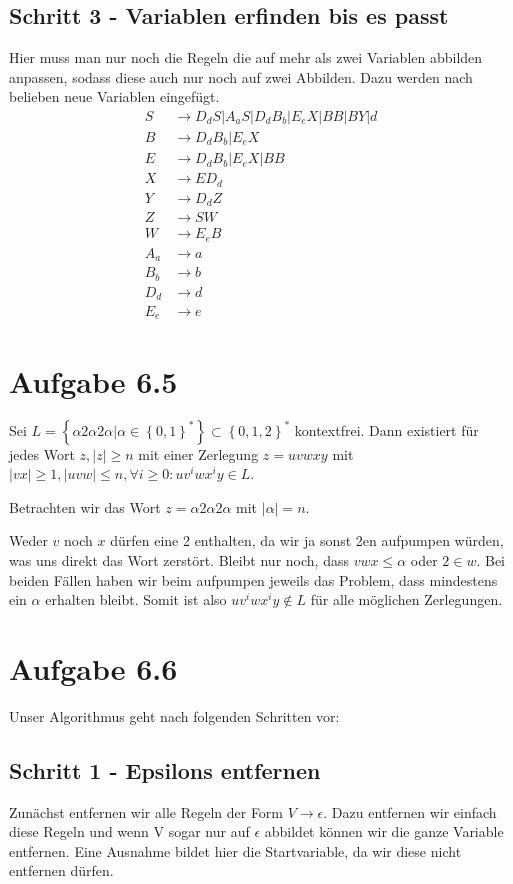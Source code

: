 \documentclass{article}
\begin{document}
\subsection*{Schritt 3 - Variablen erfinden bis es passt}
Hier muss man nur noch die Regeln die auf mehr als zwei Variablen abbilden anpassen, sodass diese auch nur noch auf zwei Abbilden. Dazu werden nach belieben neue Variablen eingefügt.
\begin{align*}
S&\rightarrow D_dS | A_aS | D_dB_b | E_eX | BB | BY | d\\
B&\rightarrow D_dB_b | E_eX\\
E&\rightarrow D_dB_b | E_eX | BB\\
X&\rightarrow ED_d \\
Y&\rightarrow D_dZ \\
Z&\rightarrow SW \\
W&\rightarrow E_eB \\
A_a&\rightarrow a\\
B_b&\rightarrow b\\
D_d&\rightarrow d\\
E_e&\rightarrow e
\end{align*}



\section*{Aufgabe 6.5}
Sei $L = \left\{\alpha 2 \alpha 2 \alpha | \alpha \in \left\{0,1\right\}^* \right\} \subset \left\{0,1,2\right\}^*$ kontextfrei. Dann existiert für jedes Wort $z, |z|\geq n$ mit einer Zerlegung $z=uvwxy$ mit $|vx|\geq 1, |uvw|\leq n, \forall i \geq 0: uv^iwx^iy \in L$.

Betrachten wir das Wort $z = \alpha 2 \alpha 2 \alpha$ mit $|\alpha|=n$.

Weder $v$ noch $x$ dürfen eine 2 enthalten, da wir ja sonst 2en aufpumpen würden, was uns direkt das Wort zerstört. Bleibt nur noch, dass $vwx \leq \alpha$ oder $2 \in w$. Bei beiden Fällen haben wir beim aufpumpen jeweils das Problem, dass mindestens ein $\alpha$ erhalten bleibt. Somit ist also $uv^iwx^iy \notin L$ für alle möglichen Zerlegungen.



\section*{Aufgabe 6.6}
Unser Algorithmus geht nach folgenden Schritten vor:
\subsection*{Schritt 1 - Epsilons entfernen}
Zunächst entfernen wir alle Regeln der Form $V\rightarrow \epsilon$. Dazu entfernen wir einfach diese Regeln und wenn V sogar nur auf $\epsilon$ abbildet können wir die ganze Variable entfernen. Eine Ausnahme bildet hier die Startvariable, da wir diese nicht entfernen dürfen.
\end{document}
